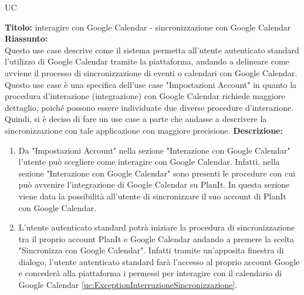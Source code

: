 \begin{listaPersonale}{UC}
\begin{listaPersonale2}[UC] {}
        \newpage

        \begin{center}
            
        \end{center}

        \begin{listaPersonale3}[UC]{}
            \textbf{Titolo:} interagire con Google Calendar - sincronizzazione con Google Calendar\\
            \textbf{Riassunto:} \\
            Questo use case descrive come il sistema permetta all'utente autenticato standard l'utilizzo di Google Calendar tramite la piattaforma, andando a delineare come avviene il processo di sincronizzazione di eventi o calendari con Google Calendar.
            Questo use case è una specifica dell'use case "Impostazioni Account" in quanto la procedura d'interazione (integrazione) con Google Calendar richiede maggiore dettaglio, poiché possono essere individuate due diverse procedure d'interazione. Quindi, si è deciso di fare un use case a parte che andasse a descrivere la sincronizzazione con tale applicazione con maggiore precisione.
            \textbf{Descrizione:}
            \begin{enumerate}
                \item Da "Impostazioni Account" nella sezione "Interazione con Google Calendar" l'utente può scegliere come interagire con Google Calendar. Infatti, nella sezione "Interazione con Google Calendar" sono presenti le procedure con cui può avvenire l'integrazione di Google Calendar su PlanIt. In questa sezione viene data la possibilità all'utente di sincronizzare il suo account di PlanIt con Google Calendar.
                \item L'utente autenticato standard potrà iniziare la procedura di sincronizzazione tra il proprio account PlanIt e Google Calendar andando a premere la scelta "Sincronizza con Google Calendar". Infatti tramite un'apposita finestra di dialogo, l'utente autenticato standard farà l'accesso al proprio account Google e concederà alla piattaforma i permessi per interagire con il calendario di Google Calendar \ref{uc:ExceptionInterruzioneSincronizzazione}.

\end{enumerate}
\end{listaPersonale3}
\end{listaPersonale2}
\end{listaPersonale}
